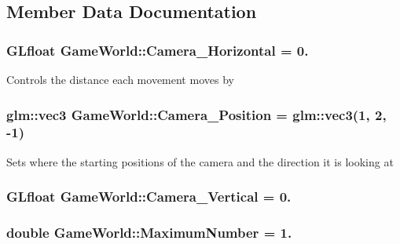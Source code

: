 \subsection{Member Data Documentation}
\hypertarget{classGameWorld_a7f4911dda9b3b4e4eb03ece87e16cd96}{}
\subsubsection[{Camera\+\_\+\+Horizontal}]{\setlength{\rightskip}{0pt plus 5cm}G\+Lfloat Game\+World\+::\+Camera\+\_\+\+Horizontal = 0.}\label{classGameWorld_a7f4911dda9b3b4e4eb03ece87e16cd96}
Controls the distance each movement moves by \hypertarget{classGameWorld_ad80e597474ea4c52a583e81788187571}{}
\subsubsection[{Camera\+\_\+\+Position}]{\setlength{\rightskip}{0pt plus 5cm}glm\+::vec3 Game\+World\+::\+Camera\+\_\+\+Position = glm\+::vec3(1, 2, -\/1)}\label{classGameWorld_ad80e597474ea4c52a583e81788187571}
Sets where the starting positions of the camera and the direction it is looking at \hypertarget{classGameWorld_a26658e739c4d267b1be35ed820089931}{}
\subsubsection[{Camera\+\_\+\+Vertical}]{\setlength{\rightskip}{0pt plus 5cm}G\+Lfloat Game\+World\+::\+Camera\+\_\+\+Vertical = 0.}\label{classGameWorld_a26658e739c4d267b1be35ed820089931}
\hypertarget{classGameWorld_a1cddcf233625a98581eaeb9fd7c8c574}{}
\subsubsection[{Maximum\+Number}]{\setlength{\rightskip}{0pt plus 5cm}double Game\+World\+::\+Maximum\+Number = 1.}\label{classGameWorld_a1cddcf233625a98581eaeb9fd7c8c574}
\hypertarget{classGameWorld_a54ccf4cf03172ab8779e9c326c8846ed}{}

